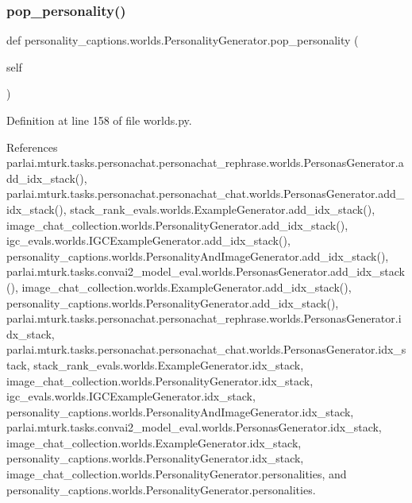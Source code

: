 \subsubsection{\texorpdfstring{pop\+\_\+personality()}{pop\_personality()}}
{\footnotesize\ttfamily def personality\+\_\+captions.\+worlds.\+Personality\+Generator.\+pop\+\_\+personality (\begin{DoxyParamCaption}\item[{}]{self }\end{DoxyParamCaption})}



Definition at line 158 of file worlds.\+py.



References parlai.\+mturk.\+tasks.\+personachat.\+personachat\+\_\+rephrase.\+worlds.\+Personas\+Generator.\+add\+\_\+idx\+\_\+stack(), parlai.\+mturk.\+tasks.\+personachat.\+personachat\+\_\+chat.\+worlds.\+Personas\+Generator.\+add\+\_\+idx\+\_\+stack(), stack\+\_\+rank\+\_\+evals.\+worlds.\+Example\+Generator.\+add\+\_\+idx\+\_\+stack(), image\+\_\+chat\+\_\+collection.\+worlds.\+Personality\+Generator.\+add\+\_\+idx\+\_\+stack(), igc\+\_\+evals.\+worlds.\+I\+G\+C\+Example\+Generator.\+add\+\_\+idx\+\_\+stack(), personality\+\_\+captions.\+worlds.\+Personality\+And\+Image\+Generator.\+add\+\_\+idx\+\_\+stack(), parlai.\+mturk.\+tasks.\+convai2\+\_\+model\+\_\+eval.\+worlds.\+Personas\+Generator.\+add\+\_\+idx\+\_\+stack(), image\+\_\+chat\+\_\+collection.\+worlds.\+Example\+Generator.\+add\+\_\+idx\+\_\+stack(), personality\+\_\+captions.\+worlds.\+Personality\+Generator.\+add\+\_\+idx\+\_\+stack(), parlai.\+mturk.\+tasks.\+personachat.\+personachat\+\_\+rephrase.\+worlds.\+Personas\+Generator.\+idx\+\_\+stack, parlai.\+mturk.\+tasks.\+personachat.\+personachat\+\_\+chat.\+worlds.\+Personas\+Generator.\+idx\+\_\+stack, stack\+\_\+rank\+\_\+evals.\+worlds.\+Example\+Generator.\+idx\+\_\+stack, image\+\_\+chat\+\_\+collection.\+worlds.\+Personality\+Generator.\+idx\+\_\+stack, igc\+\_\+evals.\+worlds.\+I\+G\+C\+Example\+Generator.\+idx\+\_\+stack, personality\+\_\+captions.\+worlds.\+Personality\+And\+Image\+Generator.\+idx\+\_\+stack, parlai.\+mturk.\+tasks.\+convai2\+\_\+model\+\_\+eval.\+worlds.\+Personas\+Generator.\+idx\+\_\+stack, image\+\_\+chat\+\_\+collection.\+worlds.\+Example\+Generator.\+idx\+\_\+stack, personality\+\_\+captions.\+worlds.\+Personality\+Generator.\+idx\+\_\+stack, image\+\_\+chat\+\_\+collection.\+worlds.\+Personality\+Generator.\+personalities, and personality\+\_\+captions.\+worlds.\+Personality\+Generator.\+personalities.

